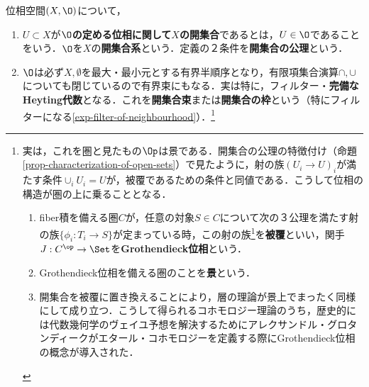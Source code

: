 \documentclass[uplatex,dvipdfmx]{jsreport}
\begin{document}
\begin{definition}
    位相空間$(X,\O)$について，
    \begin{enumerate}
        \item $U\subset X$が\textbf{$\O$の定める位相に関して$X$の開集合}であるとは，$U\in\O$であることをいう．$\O$を$X$の\textbf{開集合系}という．定義の２条件を\textbf{開集合の公理}という．
        \item $\O$は必ず$X,\emptyset$を最大・最小元とする有界半順序となり，有限項集合演算$\cap,\cup$についても閉じているので有界束にもなる．実は特に，フィルター・\textbf{完備なHeyting代数}となる．これを\textbf{開集合束}または\textbf{開集合の枠}という（特にフィルターになる\ref{exp-filter-of-neighbourhood}）．\footnote{実は，これを圏と見たもの$\Op$は景である．開集合の公理の特徴付け（命題\ref{prop-characterization-of-open-sets}）で見たように，射の族$(U_i\to U)_i$が満たす条件$\cup_iU_i=U$が，被覆であるための条件と同値である．こうして位相の構造が圏の上に乗ることとなる．
        \begin{enumerate}
            \item fiber積を備える圏$C$が，任意の対象$S\in C$について次の３公理を満たす射の族$\{\phi_i:T_i\to S\}$が定まっている時，この射の族\footnote{正確には射の族ではなく，篩(sieve)と呼ばれる対象である}を\textbf{被覆}といい，関手$J:C^\op\to\Set$を\textbf{Grothendieck位相}という．
            \item Grothendieck位相を備える圏のことを\textbf{景}という．
            \item 開集合を被覆に置き換えることにより，層の理論が景上でまったく同様にして成り立つ．こうして得られるコホモロジー理論のうち，歴史的には代数幾何学のヴェイユ予想を解決するためにアレクサンドル・グロタンディークがエタール・コホモロジーを定義する際にGrothendieck位相の概念が導入された．
        \end{enumerate}}
    \end{enumerate}
\end{definition}
\end{document}
